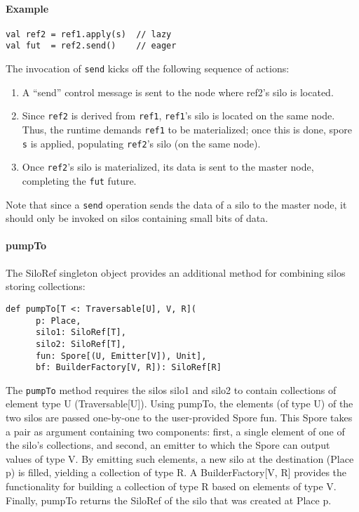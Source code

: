 \documentclass{easychair}
\begin{document}
\paragraph{Example}

\begin{verbatim}
val ref2 = ref1.apply(s)  // lazy
val fut  = ref2.send()    // eager
\end{verbatim}
\noindent
The invocation of \verb|send| kicks off the following sequence of actions:
\begin{enumerate}
\item A ``send'' control message is sent to the node where ref2's silo is located.
\item Since \verb|ref2| is derived from \verb|ref1|, \verb|ref1|'s silo is located on the same node. Thus, the runtime demands
      \verb|ref1| to be materialized; once this is done, spore \verb|s| is applied, populating \verb|ref2|'s silo (on the same node).
\item Once \verb|ref2|'s silo is materialized, its data is sent to the master node, completing the \verb|fut| future.
\end{enumerate}
\noindent
Note that since a \verb|send| operation sends the data of a silo to the master
node, it should only be invoked on silos containing small bits of data.

\paragraph{pumpTo}

The SiloRef singleton object provides an additional method for combining silos
storing collections:

\begin{verbatim}
def pumpTo[T <: Traversable[U], V, R](
      p: Place,
      silo1: SiloRef[T],
      silo2: SiloRef[T],
      fun: Spore[(U, Emitter[V]), Unit],
      bf: BuilderFactory[V, R]): SiloRef[R]
\end{verbatim}
\noindent
The \verb|pumpTo| method requires the silos silo1 and silo2 to contain collections of
element type U (Traversable[U]). Using pumpTo, the elements (of type U) of the
two silos are passed one-by-one to the user-provided Spore fun. This Spore
takes a pair as argument containing two components: first, a single element of
one of the silo's collections, and second, an emitter to which the Spore can
output values of type V. By emitting such elements, a new silo at the
destination (Place p) is filled, yielding a collection of type R. A
BuilderFactory[V, R] provides the functionality for building a collection of
type R based on elements of type V. Finally, pumpTo returns the SiloRef of the
silo that was created at Place p.
\end{document}
